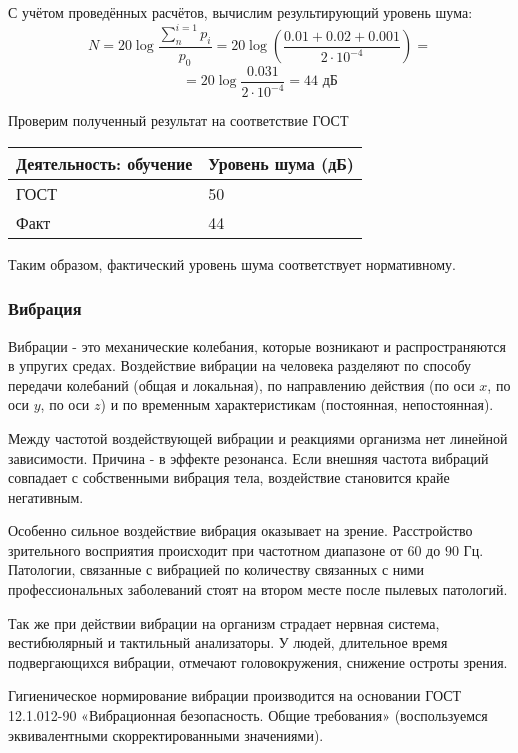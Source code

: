 С учётом проведённых расчётов, вычислим результирующий уровень шума:
$$
N = 20 \log \frac{\sum\limits_{n}^{i=1}p_i}{p_0} =  20 \log \left(\frac{0.01 + 0.02 + 0.001}{2 \cdot 10^{-4}}\right) = 
$$
$$
=  20 \log \frac{0.031}{2 \cdot 10^{-4}} = 44 \mbox{ дБ}
$$

Проверим полученный результат на соответствие ГОСТ

\begin{table}[H]
\begin{center}
\begin{tabular}{|p{4cm}|p{3cm}|}
\hline
Деятельность: обучение & Уровень шума (дБ)  \\
\hline
ГОСТ & 50  \\
\hline
Факт & 44  \\
\hline
\end{tabular}
\end{center}
\end{table}

Таким образом, фактический уровень шума соответствует нормативному.

\subsubsection{Вибрация}

Вибрации - это механические колебания, которые возникают и распространяются в упругих средах. Воздействие вибрации на человека разделяют по способу передачи коле\-баний (общая и локальная), по направлению действия (по оси $x$, по оси $y$, по оси $z$) и по временным характеристикам (постоянная, непостоянная).

Между частотой воздействующей вибрации и реакциями организма нет линейной зави\-симости. Причина - в эффекте резонанса. Если внешняя частота вибраций совпадает с собственными вибрация тела, воздействие становится крайе негативным.

Особенно сильное воздействие вибрация оказывает на зрение. Расстройство зрительного восприятия происходит при частотном диапазоне от $60$ до $90$ Гц. Патологии, связанные с вибрацией по количеству связанных с ними профессиональных заболеваний стоят на втором месте после пылевых патологий.

Так же при действии вибрации на организм страдает нервная система, вестибюлярный и тактильный анализаторы. У людей, длительное время подвергающихся вибрации, отме\-чают головокружения, снижение остроты зрения.

Гигиеническое нормирование вибрации производится на основании ГОСТ 12.1.012-90 «Вибрационная безопасность. Общие требования» (воспользуемся эквивалентными скор\-ректированными значениями).

